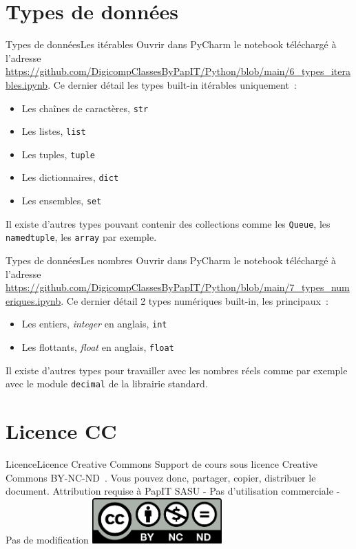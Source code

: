 \documentclass{beamer}
\begin{document}
    \section{Types de données}\label{sec:data-types}

    \begin{frame}{Types de données}{Les itérables}
        Ouvrir dans PyCharm le notebook téléchargé à l'adresse \url{https://github.com/DigicompClassesByPapIT/Python/blob/main/6_types_iterables.ipynb}.
        \bigbreak
        Ce dernier détail les types built-in itérables uniquement~:
        \begin{itemize}
            \item Les chaînes de caractères, \lstinline{str}
            \item Les listes, \lstinline{list}
            \item Les tuples, \lstinline{tuple}
            \item Les dictionnaires, \lstinline{dict}
            \item Les ensembles, \lstinline{set}
        \end{itemize}
        Il existe d'autres types pouvant contenir des collections comme les \lstinline{Queue}, les \lstinline{namedtuple}, les \lstinline{array} par exemple.
    \end{frame}

    \begin{frame}{Types de données}{Les nombres}
        Ouvrir dans PyCharm le notebook téléchargé à l'adresse \url{https://github.com/DigicompClassesByPapIT/Python/blob/main/7_types_numeriques.ipynb}.
        \bigbreak
        Ce dernier détail 2 types numériques built-in, les principaux~:
        \begin{itemize}
            \item Les entiers, \textit{integer} en anglais, \lstinline{int}
            \item Les flottants, \textit{float} en anglais, \lstinline{float}
        \end{itemize}
        Il existe d'autres types pour travailler avec les nombres réels comme par exemple avec le module \lstinline{decimal} de la librairie standard.
    \end{frame}

    \section{Licence CC}\label{sec:licence}

    \begin{frame}{Licence}{Licence Creative Commons}
        Support de cours sous licence Creative Commons BY-NC-ND~.
        \bigbreak
        Vous pouvez donc, partager, copier, distribuer le document.
        \bigbreak
        Attribution requise à PapIT SASU - Pas d’utilisation commerciale - Pas de modification
        \bigbreak
        \centering
        \includegraphics[width=5cm]{image/by-nc-nd-logo}
    \end{frame}
\end{document}
